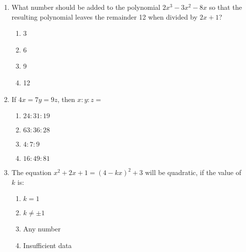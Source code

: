 \begin{enumerate}[label=(\roman*)]
    \item What number should be added to the polynomial 
        $2x^3 - 3x^2 - 8x$ so that the resulting polynomial
        leaves the remainder 12 when divided by $2x+1$?

        \begin{multicols}{2}
        \begin{enumerate}[label=(\alph*)]
            \item 3
            \item 6
            \item 9
            \item 12
        \end{enumerate}
        \end{multicols}

    \item If $4x = 7y = 9z$, then $x:y:z=$ 

        \begin{multicols}{2}
        \begin{enumerate}[label=(\alph*)]
            \item $24:31:19$ 
            \item $63:36:28$ 
            \item $4:7:9$ 
            \item $16:49:81$ 
        \end{enumerate}
        \end{multicols}

    \item The equation $x^2 + 2x + 1 = (4-kx)^2 + 3$ will be quadratic,
        if the value of $k$ is:

        \begin{multicols}{2}
        \begin{enumerate}[label=(\alph*)]
            \item $k=1$ 
            \item $k \ne \pm 1$ 
            \item Any number
            \item Insufficient data
        \end{enumerate}
        \end{multicols}


\end{enumerate}
